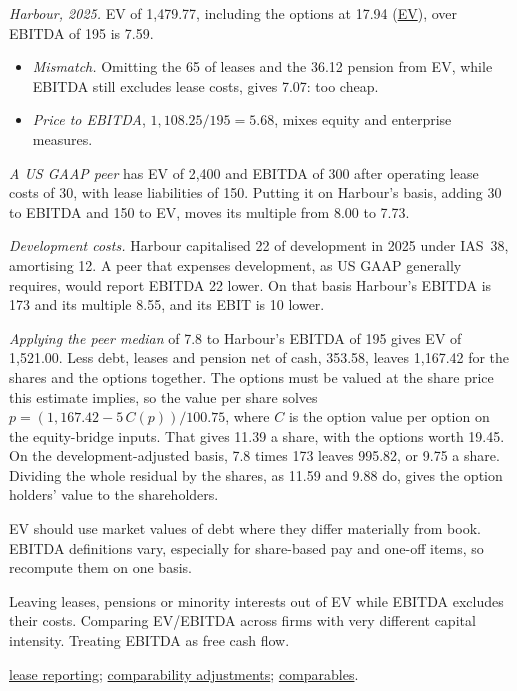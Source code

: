 \begin{qfmethod}
 \emph{Harbour, 2025.} EV of 1,479.77, including the options at 17.94 (\hyperref[def:price-value-indicators]{EV}), over EBITDA of 195 is 7.59.
\begin{itemize}
\item \emph{Mismatch.} Omitting the 65 of leases and the 36.12 pension from EV, while EBITDA still excludes lease costs, gives 7.07: too cheap.
\item \emph{Price to EBITDA}, $1{,}108.25/195=5.68$, mixes equity and enterprise measures.
\end{itemize}

\emph{A US GAAP peer} has EV of 2,400 and EBITDA of 300 after operating lease costs of 30, with lease liabilities of 150. Putting it on Harbour's basis, adding 30 to EBITDA and 150 to EV, moves its multiple from 8.00 to 7.73.

\emph{Development costs.} Harbour capitalised 22 of development in 2025 under IAS~38, amortising 12. A peer that expenses development, as US GAAP generally requires, would report EBITDA 22 lower. On that basis Harbour's EBITDA is 173 and its multiple 8.55, and its EBIT is 10 lower.

\emph{Applying the peer median} of 7.8 to Harbour's EBITDA of 195 gives EV of 1,521.00. Less debt, leases and pension net of cash, 353.58, leaves 1,167.42 for the shares and the options together. The options must be valued at the share price this estimate implies, so the value per share solves $p=(1{,}167.42-5\,C(p))/100.75$, where $C$ is the option value per option on the equity-bridge inputs. That gives 11.39 a share, with the options worth 19.45. On the development-adjusted basis, 7.8 times 173 leaves 995.82, or 9.75 a share. Dividing the whole residual by the shares, as 11.59 and 9.88 do, gives the option holders' value to the shareholders.

 EV should use market values of debt where they differ materially from book. EBITDA definitions vary, especially for share-based pay and one-off items, so recompute them on one basis.

 Leaving leases, pensions or minority interests out of EV while EBITDA excludes their costs. Comparing EV/EBITDA across firms with very different capital intensity. Treating EBITDA as free cash flow.

 \hyperref[meth:lease-reporting]{lease reporting}; \hyperref[meth:accounting-analysis-adjustments]{comparability adjustments}; \hyperref[meth:comparables-evaluation]{comparables}.

\end{qfmethod}

